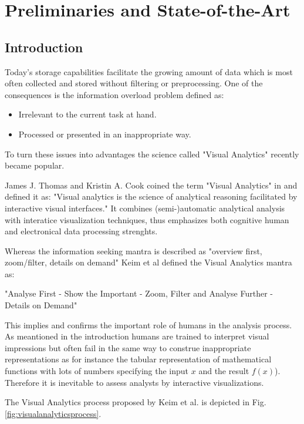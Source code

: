 \section{Preliminaries and State-of-the-Art}\label{sec::relwork} %

\subsection{Introduction}
Today's storage capabilities facilitate the growing amount of data which is most often collected and stored without filtering or preprocessing.
One of the consequences is the information overload problem defined as:

\begin{itemize}
\item Irrelevant to the current task at hand.
\item Processed or presented in an inappropriate way.
\end{itemize}

To turn these issues into advantages the science called "Visual Analytics" recently became popular. 

James J. Thomas and Kristin A. Cook coined the term "Visual Analytics" in \cite{VISUAL_ANALYTICS} and defined it as: "Visual analytics is the science of analytical reasoning facilitated by interactive visual interfaces." It combines (semi-)automatic analytical analysis with interatice visualization techniques, thus emphasizes both cognitive human and electronical data processing strenghts.

Whereas the information seeking mantra is described as "overview first, zoom/filter, details on demand" Keim et al defined the Visual Analytics mantra as:

"Analyse First -
Show the Important -
Zoom, Filter and Analyse Further -
Details on Demand" \cite{keim2008visual}

This implies and confirms the important role of humans in the analysis process. As meantioned in the introduction humans are trained to interpret visual impressions but often fail in the same way to construe inappropriate representations as for instance the tabular representation of mathematical functions with lots of numbers specifying the input $x$ and the result $f(x)$). Therefore it is inevitable to assess analysts by interactive visualizations.

The Visual Analytics process proposed by Keim et al. is depicted in Fig. \ref{fig:visualanalyticsprocess}.

